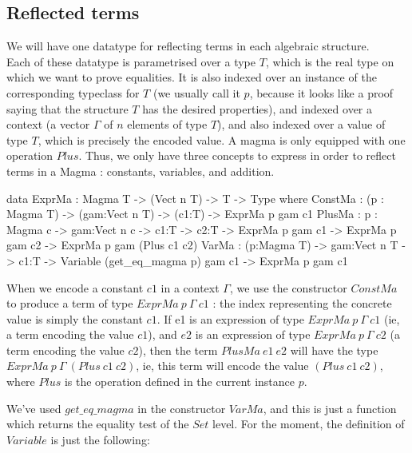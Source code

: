 \documentclass{sigplanconf}
\begin{document}
	\subsection {Reflected terms}

We will have one datatype for reflecting terms in each algebraic structure. \\
Each of these datatype is parametrised over a type $T$, which is the real type on which we want to prove equalities. It is also indexed over an instance of the corresponding typeclass for $T$ (we usually call it $p$, because it looks like a proof saying that the structure $T$ has the desired properties), and indexed over a context (a vector $\Gamma$ of $n$ elements of type $T$), and also indexed over a value of type $T$, which is precisely the encoded value.
A magma is only equipped with one operation $Plus$. Thus, we only have three concepts to express in order to reflect terms in a Magma : constants, variables, and addition.

\begin{code}[caption=Reflected terms in a Magma, captionpos=b, label=lst1:haskell2]  
data ExprMa : Magma T -> (Vect n T) -> T -> 
              Type where
    ConstMa : (p : Magma T) -> (gam:Vect n T) 
         -> (c1:T)  -> ExprMa p gam c1 
    PlusMa : {p : Magma c} -> {gam:Vect n c}
         -> {c1:T} -> {c2:T} 
         -> ExprMa p gam c1 
         -> ExprMa p gam c2 
         -> ExprMa p gam (Plus c1 c2) 
    VarMa : (p:Magma T) -> {gam:Vect n T}
         -> {c1:T} 
         -> Variable (get_eq_magma p) gam c1
         -> ExprMa p gam c1
\end{code}	

When we encode a constant $c1$ in a context $\Gamma$, we use the constructor $ConstMa$ to produce a term of type $ExprMa\ p\ \Gamma\ c1$ : the index representing the concrete value is simply the constant $c1$.
If e1 is an expression of type $ExprMa\ p\ \Gamma\ c1$ (ie, a term encoding the value $c1$), and $e2$ is an expression of type $ExprMa\ p\ \Gamma\ c2$ (a term encoding the value $c2$), then the term $PlusMa\ e1\ e2$ will have the type $ExprMa\ p\ \Gamma\ (Plus\ c1\ c2)$, ie, this term will encode the value $(Plus\ c1\ c2)$, where $Plus$ is the operation defined in the current instance $p$.


We've used $get\_eq\_magma$ in the constructor $VarMa$, and this is just a function which returns the equality test of the $Set$ level.
For the moment, the definition of $Variable$ is just the following:
\end{document}
